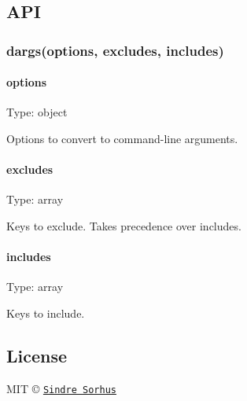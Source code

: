 \subsection*{A\+PI}

\subsubsection*{dargs(options, excludes, includes)}

\paragraph*{options}

Type\+: {\ttfamily object}

Options to convert to command-\/line arguments.

\paragraph*{excludes}

Type\+: {\ttfamily array}

Keys to exclude. Takes precedence over {\ttfamily includes}.

\paragraph*{includes}

Type\+: {\ttfamily array}

Keys to include.

\subsection*{License}

M\+IT © \href{http://sindresorhus.com}{\tt Sindre Sorhus} 